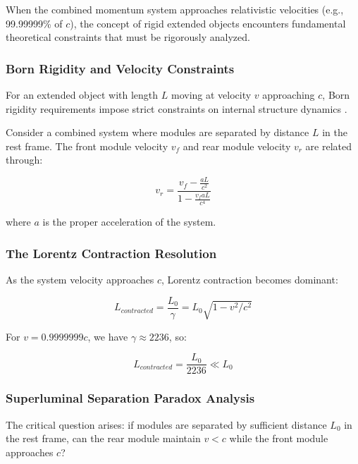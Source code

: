 \documentclass[11pt,a4paper]{article}
\theoremstyle{remark}
\begin{document}
When the combined momentum system approaches relativistic velocities (e.g., 99.99999\% of $c$), the concept of rigid extended objects encounters fundamental theoretical constraints that must be rigorously analyzed.

\subsubsection{Born Rigidity and Velocity Constraints}

For an extended object with length $L$ moving at velocity $v$ approaching $c$, Born rigidity requirements impose strict constraints on internal structure dynamics \cite{born1909electron, rindler2001introduction}.

Consider a combined system where modules are separated by distance $L$ in the rest frame. The front module velocity $v_f$ and rear module velocity $v_r$ are related through:

\begin{equation}
v_r = \frac{v_f - \frac{a L}{c^2}}{1 - \frac{v_f a L}{c^4}}
\label{eq:born_rigidity}
\end{equation}

where $a$ is the proper acceleration of the system.

\subsubsection{The Lorentz Contraction Resolution}

As the system velocity approaches $c$, Lorentz contraction becomes dominant:

\begin{equation}
L_{contracted} = \frac{L_0}{\gamma} = L_0 \sqrt{1 - v^2/c^2}
\label{eq:lorentz_contraction}
\end{equation}

For $v = 0.9999999c$, we have $\gamma \approx 2236$, so:

\begin{equation}
L_{contracted} = \frac{L_0}{2236} \ll L_0
\label{eq:extreme_contraction}
\end{equation}

\subsubsection{Superluminal Separation Paradox Analysis}

The critical question arises: if modules are separated by sufficient distance $L_0$ in the rest frame, can the rear module maintain $v < c$ while the front module approaches $c$?
\end{document}
